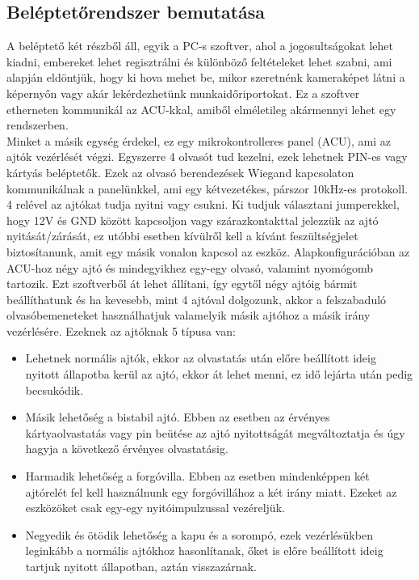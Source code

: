 \documentclass[a4paper, 12pt]{article}
\newcommand{\tab}{\hspace*{1em}}
\begin{document}
\subsection{Beléptetőrendszer bemutatása}
\tab A beléptető két részből áll, egyik a PC-s szoftver, ahol a jogosultságokat lehet kiadni, embereket lehet regisztrálni és különböző feltételeket lehet szabni, ami alapján eldöntjük, hogy ki hova mehet be, mikor szeretnénk kameraképet látni a képernyőn vagy akár lekérdezhetünk munkaidőriportokat. Ez a szoftver etherneten kommunikál az ACU-kkal, amiből elméletileg akármennyi lehet egy rendszerben.\\
Minket a másik egység érdekel, ez egy mikrokontrolleres panel (ACU), ami az ajtók vezérlését végzi. Egyszerre 4 olvasót tud kezelni, ezek lehetnek PIN-es vagy kártyás beléptetők. Ezek az olvasó berendezések Wiegand kapcsolaton kommunikálnak a panelünkkel, ami egy kétvezetékes, párszor 10kHz-es protokoll. 4 relével az ajtókat tudja nyitni vagy csukni. Ki tudjuk választani jumperekkel, hogy 12V és GND között kapcsoljon vagy szárazkontakttal jelezzük az ajtó nyitását/zárását, ez utóbbi esetben kívülről kell a kívánt feszültségjelet biztosítanunk, amit egy másik vonalon kapcsol az eszköz. Alapkonfigurációban az ACU-hoz négy ajtó és mindegyikhez egy-egy olvasó, valamint nyomógomb tartozik. Ezt szoftverből át lehet állítani, így egytől négy ajtóig bármit beállíthatunk és ha kevesebb, mint 4 ajtóval dolgozunk, akkor a felszabaduló olvasóbemeneteket használhatjuk valamelyik másik ajtóhoz a másik irány vezérlésére. Ezeknek az ajtóknak 5 típusa van:
\begin{itemize}
\vspace{-0.4em}
\item  Lehetnek normális ajtók, ekkor az olvastatás után előre beállított ideig nyitott állapotba kerül az ajtó, ekkor át lehet menni, ez idő lejárta után pedig becsukódik.
\item Másik lehetőség a bistabil ajtó. Ebben az esetben az érvényes kártyaolvastatás vagy pin beütése az ajtó nyitottságát megváltoztatja és úgy hagyja a következő érvényes olvastatásig.
\vspace{-0.5em}
\item Harmadik lehetőség a forgóvilla. Ebben az esetben mindenképpen két ajtórelét fel kell használnunk egy forgóvillához a két irány miatt. Ezeket az eszközöket csak egy-egy nyitóimpulzussal vezéreljük.
\vspace{-0.5em}
\item Negyedik és ötödik lehetőség a kapu és a sorompó, ezek vezérlésükben leginkább a normális ajtókhoz hasonlítanak, őket is előre beállított ideig tartjuk nyitott állapotban, aztán visszazárnak.
\vspace{-0.5em}
\end{itemize}
\end{document}
